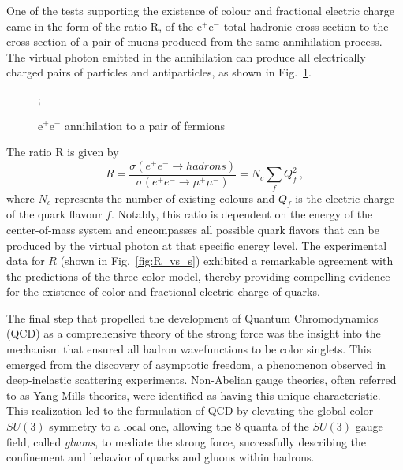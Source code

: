 One of the tests supporting the existence of colour and fractional electric charge came in the form of the ratio R, of the $\mathrm{e}^+ \mathrm{e}^-$ total hadronic cross-section to the cross-section of a pair of muons produced from the same annihilation process. The virtual photon emitted in the annihilation can produce all electrically charged pairs of particles and antiparticles, as shown in Fig.~\ref{fig:ee_to_ff_diagram}.
\begin{figure}[h]
    \centering
        ;
\caption{$\mathrm{e}^+ \mathrm{e}^-$ annihilation to a pair of fermions}
    \label{fig:ee_to_ff_diagram}
\end{figure}

The ratio R is given by
\begin{equation*}
    R = \frac{\sigma(e^+e^- \rightarrow hadrons)}{\sigma(e^+e^- \rightarrow \mu^+\mu^-)} = N_c \sum_f Q_f^2\ ,
\end{equation*}
where $N_c$ represents the number of existing colours and $Q_f$ is the electric charge of the quark flavour $f$. Notably, this ratio is dependent on the energy of the center-of-mass system and encompasses all possible quark flavors that can be produced by the virtual photon at that specific energy level. The experimental data for $R$ (shown in Fig.~\ref{fig:R_vs_s}) exhibited a remarkable agreement with the predictions of the three-color model, thereby providing compelling evidence for the existence of color and fractional electric charge of quarks.

The final step that propelled the development of Quantum Chromodynamics (QCD) as a comprehensive theory of the strong force was the insight into the mechanism that ensured all hadron wavefunctions to be color singlets. This emerged from the discovery of asymptotic freedom, a phenomenon observed in deep-inelastic scattering experiments. Non-Abelian gauge theories, often referred to as Yang-Mills theories, were identified as having this unique characteristic. This realization led to the formulation of QCD by elevating the global color $SU(3)$ symmetry to a local one, allowing the 8 quanta of the $SU(3)$ gauge field, called \emph{gluons}, to mediate the strong force, successfully describing the confinement and behavior of quarks and gluons within hadrons.

